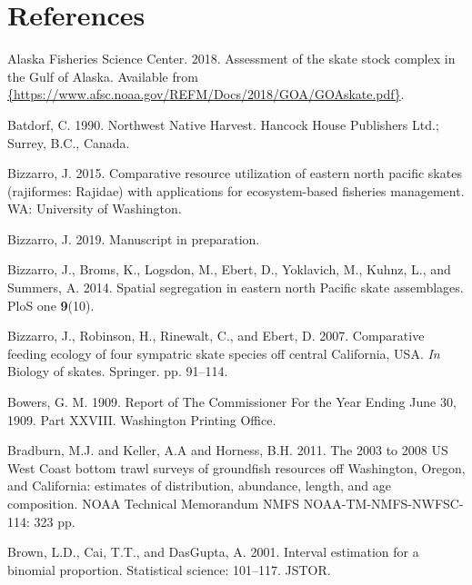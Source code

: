 \documentclass[12pt,]{article}
\begin{document}
\newpage
\FloatBarrier
\newpage

\hypertarget{references}{%
\section{References}\label{references}}

\hypertarget{refs}{}
\leavevmode\hypertarget{ref-AFSC2018}{}%
Alaska Fisheries Science Center. 2018. Assessment of the skate stock
complex in the Gulf of Alaska. Available from
\href{\%7Bhttps://www.afsc.noaa.gov/REFM/Docs/2018/GOA/GOAskate.pdf\%7D}{\{https://www.afsc.noaa.gov/REFM/Docs/2018/GOA/GOAskate.pdf\}}.

\leavevmode\hypertarget{ref-Batdorf1990}{}%
Batdorf, C. 1990. Northwest Native Harvest. Hancock House Publishers
Ltd.; Surrey, B.C., Canada.

\leavevmode\hypertarget{ref-Bizzarro2015}{}%
Bizzarro, J. 2015. Comparative resource utilization of eastern north
pacific skates (rajiformes: Rajidae) with applications for
ecosystem-based fisheries management. WA: University of Washington.

\leavevmode\hypertarget{ref-Bizzarro2019}{}%
Bizzarro, J. 2019. Manuscript in preparation.

\leavevmode\hypertarget{ref-Bizzarro2014}{}%
Bizzarro, J., Broms, K., Logsdon, M., Ebert, D., Yoklavich, M., Kuhnz,
L., and Summers, A. 2014. Spatial segregation in eastern north Pacific
skate assemblages. PloS one \textbf{9}(10).

\leavevmode\hypertarget{ref-Bizzarro2007}{}%
Bizzarro, J., Robinson, H., Rinewalt, C., and Ebert, D. 2007.
Comparative feeding ecology of four sympatric skate species off central
California, USA. \emph{In} Biology of skates. Springer. pp. 91--114.

\leavevmode\hypertarget{ref-Bowers1909}{}%
Bowers, G. M. 1909. Report of The Commissioner For the Year Ending June
30, 1909. Part XXVIII. Washington Printing Office.

\leavevmode\hypertarget{ref-Bradburn2011}{}%
Bradburn, M.J. and Keller, A.A and Horness, B.H. 2011. The 2003 to 2008
US West Coast bottom trawl surveys of groundfish resources off
Washington, Oregon, and California: estimates of distribution,
abundance, length, and age composition. NOAA Technical Memorandum NMFS
NOAA-TM-NMFS-NWFSC-114: 323 pp.

\leavevmode\hypertarget{ref-brown2001interval}{}%
Brown, L.D., Cai, T.T., and DasGupta, A. 2001. Interval estimation for a
binomial proportion. Statistical science: 101--117. JSTOR.
\end{document}
